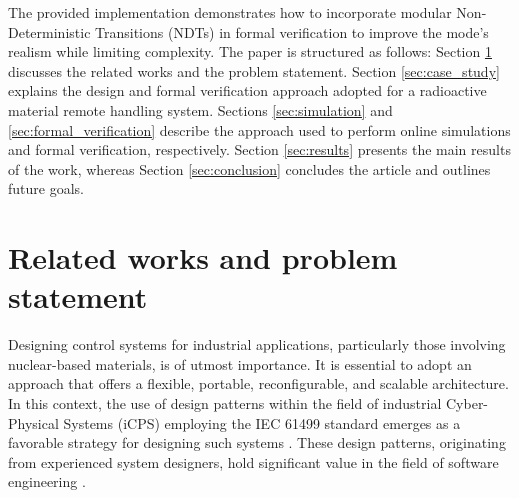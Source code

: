 \begin{bibunit}
The provided implementation demonstrates how to incorporate modular Non-Deterministic Transitions (NDTs) in formal verification to improve the mode's realism while limiting complexity. 
The paper is structured as follows: Section \ref{sec:problem_statement} discusses the related works and the problem statement. Section \ref{sec:case_study} explains the design and formal verification approach adopted for a radioactive material remote handling system. Sections \ref{sec:simulation} and \ref{sec:formal_verification} describe the approach used to perform online simulations and formal verification, respectively. Section \ref{sec:results} presents the main results of the work, whereas Section \ref{sec:conclusion} concludes the article and outlines future goals.

\section{Related works and problem statement}
\label{sec:problem_statement}
Designing control systems for industrial applications, particularly those involving nuclear-based materials, is of utmost importance. It is essential to adopt an approach that offers a flexible, portable, reconfigurable, and scalable architecture. 
In this context, the use of design patterns within the field of industrial Cyber-Physical Systems (iCPS) employing the IEC 61499 standard emerges as a favorable strategy for designing such systems \cite{dai2017discrete, patil2018}. 
These design patterns, originating from experienced system designers, hold significant value in the field of software engineering \cite{gamma1995design}.


\end{bibunit}
